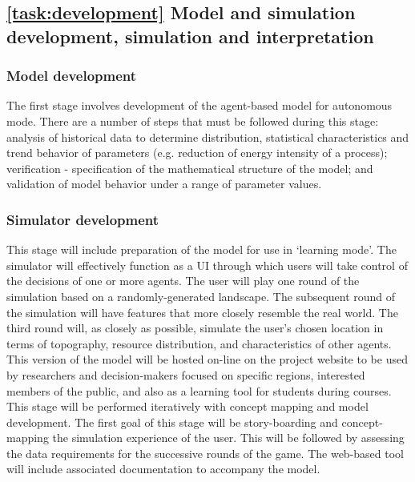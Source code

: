\documentclass[11pt,a4paper]{article}
\begin{document}
\subsection{\ref{task:development} Model and simulation development, simulation and interpretation}
\label{sec:task:development}


\subsubsection{Model development}

The first stage involves 
development of the agent-based model for autonomous mode.
There are a number of steps 
that must be followed during this stage: 
analysis of historical data to determine distribution, 
statistical characteristics and trend behavior of parameters 
(e.g. reduction of energy intensity of a process); 
verification - specification of the mathematical structure of the model; 
and validation of model behavior under a range of parameter values.

\subsubsection{Simulator development}


This stage will include preparation of the model 
for use in `learning mode'.
The simulator will effectively function as a 
UI through which users will 
take control of the decisions of one or more agents.
The user will play one round of the simulation based 
on a randomly-generated landscape.
The subsequent round of the simulation 
will have features that more closely resemble the real world.
The third round will, as closely as possible, 
simulate the user's chosen location in terms of 
topography, 
resource distribution, and
characteristics of other agents.
This version of the model will be hosted on-line on the project website 
to be used by researchers and decision-makers focused on specific regions,
interested members of the public, 
and also as a learning tool for students during courses.
This stage will be performed iteratively with concept mapping and model development.
The first goal of this stage will be 
story-boarding and 
concept-mapping 
the simulation experience of the user.
This will be followed by assessing the 
data requirements for the successive rounds of the game.
The web-based tool will include associated documentation to accompany the model.
\end{document}
